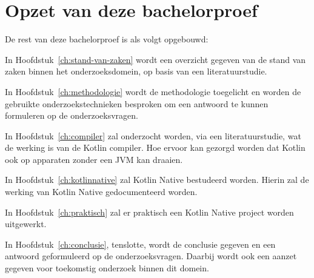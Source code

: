 \section{Opzet van deze bachelorproef}
\label{sec:opzet-bachelorproef}

De rest van deze bachelorproef is als volgt opgebouwd:

In Hoofdstuk~\ref{ch:stand-van-zaken} wordt een overzicht gegeven van de stand van zaken binnen het onderzoeksdomein, op basis van een literatuurstudie.

In Hoofdstuk~\ref{ch:methodologie} wordt de methodologie toegelicht en worden de gebruikte onderzoekstechnieken besproken om een antwoord te kunnen formuleren op de onderzoeksvragen.

In Hoofdstuk~\ref{ch:compiler} zal onderzocht worden, via een literatuurstudie, wat de werking is van de Kotlin compiler. Hoe ervoor kan gezorgd worden dat Kotlin ook op apparaten zonder een JVM kan draaien.

In Hoofdstuk~\ref{ch:kotlinnative} zal Kotlin Native bestudeerd worden. Hierin zal de werking van Kotlin Native gedocumenteerd worden.

In Hoofdstuk~\ref{ch:praktisch} zal er praktisch een Kotlin Native project worden uitgewerkt.

In Hoofdstuk~\ref{ch:conclusie}, tenslotte, wordt de conclusie gegeven en een antwoord geformuleerd op de onderzoeksvragen. Daarbij wordt ook een aanzet gegeven voor toekomstig onderzoek binnen dit domein.

